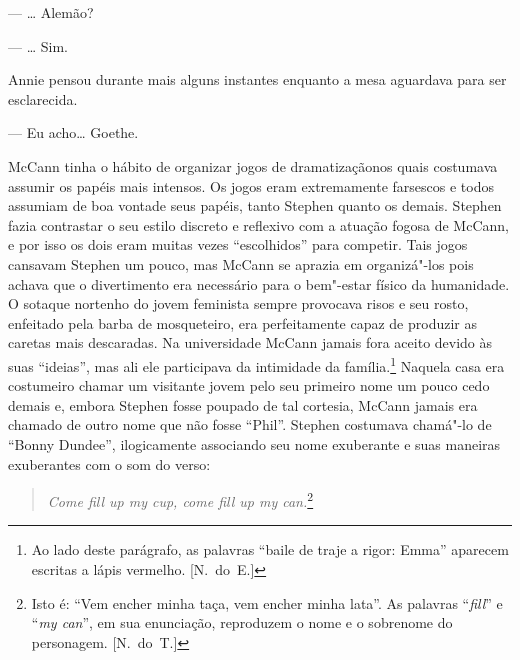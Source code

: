 --- \ldots{} Alemão?

--- \ldots{} Sim.

Annie pensou durante mais alguns instantes enquanto a mesa aguardava
para ser esclarecida.

--- Eu acho\ldots{} Goethe.

McCann tinha o hábito de organizar \label{jogos"-de} jogos de dramatização\break nos quais
costumava assumir os papéis mais intensos.  Os jogos eram extremamente
farsescos e todos assumiam de boa vontade seus papéis, tanto Stephen
quanto os demais.  Stephen fazia contrastar o seu
estilo discreto e reflexivo com a atuação fogosa de McCann, e por isso
os dois eram muitas vezes “escolhidos” para competir.  Tais jogos
cansavam Stephen um pouco, mas McCann se aprazia em organizá"-los pois
achava que o divertimento era necessário para o bem"-estar físico da
humanidade.  O sotaque nortenho do jovem feminista sempre provocava
risos e seu rosto, enfeitado pela barba de mosqueteiro, era
perfeitamente capaz de produzir as caretas mais descaradas.  Na
universidade McCann jamais fora aceito devido às suas “ideias”,
mas ali ele participava da intimidade da família.\footnote{ Ao lado
deste parágrafo, as palavras “baile de traje a rigor: Emma” aparecem
escritas a lápis vermelho. [N.~do~E.]}  Naquela casa era costumeiro chamar		
um visitante jovem \label{pelo"-seu} pelo seu primeiro nome um pouco cedo demais e,
embora Stephen fosse poupado de tal cortesia, McCann jamais era chamado
de outro nome que não fosse “Phil”.  Stephen costumava chamá"-lo de
“Bonny Dundee”, ilogicamente associando seu nome exuberante e suas
\label{maneiras"-exuberantes} maneiras exuberantes com o som do verso:

\begin{verse}{\itshape
Come fill up my cup, come fill up my can.}\footnote{
Isto é: “Vem encher minha taça, vem encher minha lata”.  As palavras
“\textit{fill}” e “\textit{my can}”, em sua enunciação, reproduzem o
nome e o sobrenome do personagem. [N.~do~T.]}
\end{verse}

